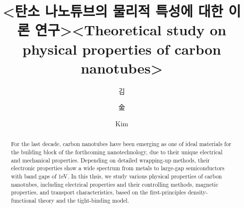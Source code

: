\documentclass[doctor,english,final]{kaist-ucs}
\title[korean] {<탄소 나노튜브의 물리적 특성에 대한 이론 연구>}
\title[english]{<Theoretical study on physical properties of
                carbon nanotubes>}
\author[korean] {김}{용 현}
\author[chinese]{金}{容 賢}
\author[english]{Kim}{Yong-Hyun}
\begin{document}

    \begin{abstract}
        For the last decade, carbon nanotubes have been emerging as one
        of ideal materials for the building block of the forthcoming
        nanotechnology, due to their unique electrical and mechanical
        properties. Depending on detailed wrapping-up methods, their
        electronic properties show a wide spectrum from metals to
        large-gap semiconductors with band gaps of 1eV.
        In this thsis, we study various physical properties of carbon
        nanotubes, including electrical properties and their controlling
        methods, magnetic properties, and transport characteristics,
        based on the first-principles density-functional theory and
        the tight-binding model.
    \end{abstract}

    \tableofcontents

    \listoftables

    \listoffigures



%

\end{document}

